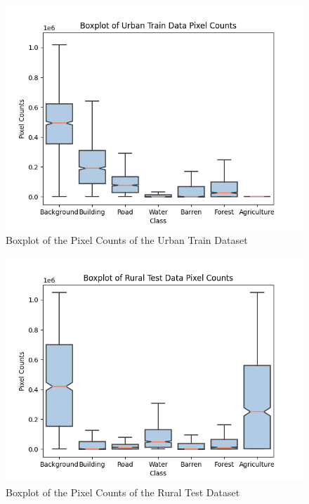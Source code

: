 \begin{figure}[!h]
\includegraphics[width=15.0cm, height=8.5cm]{images/urban train boxplot.png}
\centering
\caption{Boxplot of the Pixel Counts of the Urban Train Dataset}
\label{fig:boxplot-urban-train}
\end{figure}

\begin{figure}[!h]
\includegraphics[width=15.0cm, height=8.5cm]{images/rural test boxplot.png}
\centering
\caption{Boxplot of the Pixel Counts of the Rural Test Dataset}
\label{fig:boxplot-rural-train}
\end{figure}

